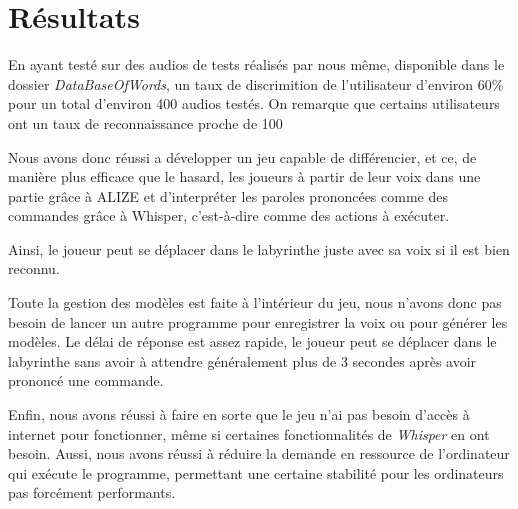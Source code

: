 \section{Résultats}
\label{sec:resultats}

En ayant testé sur des audios de tests réalisés par nous même, disponible dans le dossier \textit{DataBaseOfWords}, un taux de discrimition de l'utilisateur d'environ 60\% pour un total d'environ 400 audios testés. On remarque que certains utilisateurs ont un taux de reconnaissance proche de 100%

Nous avons donc réussi a développer un jeu capable de différencier, et ce, de manière plus efficace que le hasard, les joueurs à partir de leur voix dans une partie grâce à ALIZE et d'interpréter les paroles prononcées comme des commandes grâce à Whisper, c'est-à-dire comme des
actions à exécuter. 

Ainsi, le joueur peut se déplacer dans le labyrinthe juste avec sa voix si il est bien reconnu. 

Toute la gestion des modèles est faite à l'intérieur du jeu, nous n'avons donc pas besoin de lancer un autre programme pour enregistrer la voix ou pour générer les modèles. 
Le délai de réponse est assez rapide, le joueur peut se déplacer dans le labyrinthe sans avoir à attendre généralement plus de 3 secondes après avoir prononcé une commande. 

Enfin, nous avons réussi à faire en sorte que le jeu n'ai pas besoin d'accès à internet pour fonctionner, même si certaines fonctionnalités de \textit{Whisper} en ont besoin.
Aussi, nous avons réussi à réduire la demande en ressource de l'ordinateur qui exécute le programme, permettant une certaine stabilité pour les ordinateurs pas forcément performants.
